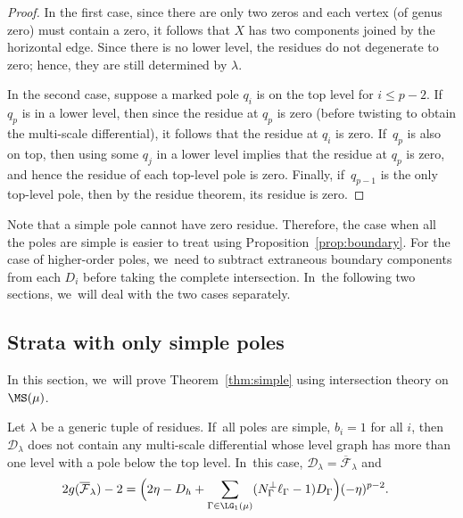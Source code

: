 \begin{proof}
In the first case, since there are only two zeros and each vertex (of genus zero) must contain a zero, it follows that $X$ has two components joined by the horizontal edge. Since there is no lower level, the residues do not degenerate to zero; hence, they are still determined by $\lambda$.

In the second case, suppose a marked pole $q_i$ is on the top level for $i\leq p-2$. If~$q_p$ is in a lower level, then since the residue at $q_p$ is zero (before twisting to obtain the multi-scale differential), it follows that the residue at $q_i$ is zero. If~$q_p$ is also on top, then using some $q_j$ in a lower level implies that the residue at $q_p$ is zero, and hence the residue of each top-level pole is zero. Finally, if~$q_{p-1}$ is the only top-level pole, then by the residue theorem, its residue is zero.
\end{proof}

Note that a simple pole cannot have zero residue. Therefore, the case when all the poles are simple is easier to treat using Proposition~\ref{prop:boundary}. For the case of higher-order poles, we~need to subtract extraneous boundary components from each $D_i$ before taking the complete intersection. In~the following two sections, we~will deal with the two cases separately.

\subsection{Strata with only simple poles}
\label{sec:simple}

In this section, we~will prove Theorem~\ref{thm:simple} using intersection theory on $\MS(\mu)$.

\begin{cor}
\label{cor:boundary-simple}
Let $\lambda$ be a generic tuple of residues. If~all poles are simple, \ie $b_i = 1$ for all $i$, then $\mathcal D_\lambda $ does not contain any multi-scale differential whose level graph has more than one level with a pole below the top level. In~this case, $\mathcal D_\lambda = \overline{\mathcal F}_\lambda$ and
\begin{align}
\label{eq:simple}
2g (\overline{\mathcal F}_\lambda) - 2 & = \Bigl( 2\eta - D_h + \sum_{\Gamma\in \LG_1(\mu)} (N_{\Gamma}^{\bot} \ell_\Gamma - 1) D_\Gamma \Bigr) (-\eta)^{p-2}.
\end{align}
\end{cor}

